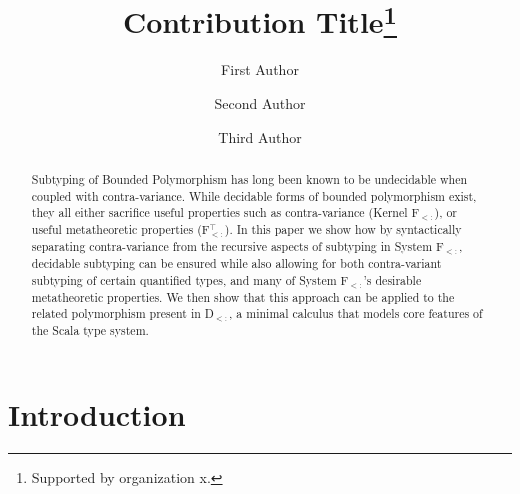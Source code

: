 \documentclass[runningheads]{llncs}
\begin{document}
%
\title{Contribution Title\thanks{Supported by organization x.}}
%
%
\author{First Author \and
Second Author \and
Third Author}
%
%
%
\maketitle              %
%
\begin{abstract}
Subtyping of Bounded Polymorphism has long been known
to be undecidable when coupled with contra-variance. While decidable forms of bounded polymorphism exist, they all either sacrifice useful properties such as contra-variance 
(Kernel F$_{<:}$), or 
useful metatheoretic properties (F$_{<:}^\top$).
In this paper we show how by syntactically separating contra-variance from 
the recursive aspects of subtyping in System F$_{<:}$, decidable subtyping can be ensured while also allowing for both contra-variant subtyping
of certain quantified types, and many of System F$_{<:}$'s desirable metatheoretic properties. We then show that this approach can be applied to the related polymorphism present in D$_{<:}$, a minimal calculus that models core features of the Scala type system.

\end{abstract}

\section{Introduction}
\label{s:intro}
\end{document}
